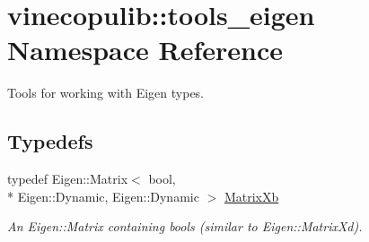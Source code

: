 \hypertarget{namespacevinecopulib_1_1tools__eigen}{\section{vinecopulib\+:\+:tools\+\_\+eigen Namespace Reference}
\label{namespacevinecopulib_1_1tools__eigen}
}


Tools for working with Eigen types.  


\subsection*{Typedefs}
\begin{DoxyCompactItemize}
\item 
\hypertarget{namespacevinecopulib_1_1tools__eigen_a2fcd63009df35741859f44f1e41931f9}{typedef Eigen\+::\+Matrix$<$ bool, \\*
Eigen\+::\+Dynamic, Eigen\+::\+Dynamic $>$ \hyperlink{namespacevinecopulib_1_1tools__eigen_a2fcd63009df35741859f44f1e41931f9}{Matrix\+Xb}}\label{namespacevinecopulib_1_1tools__eigen_a2fcd63009df35741859f44f1e41931f9}

\begin{DoxyCompactList}\small\item\em An {\ttfamily Eigen\+::\+Matrix} containing {\ttfamily bool}s (similar to {\ttfamily Eigen\+::\+Matrix\+Xd}). \end{DoxyCompactList}\end{DoxyCompactItemize}
